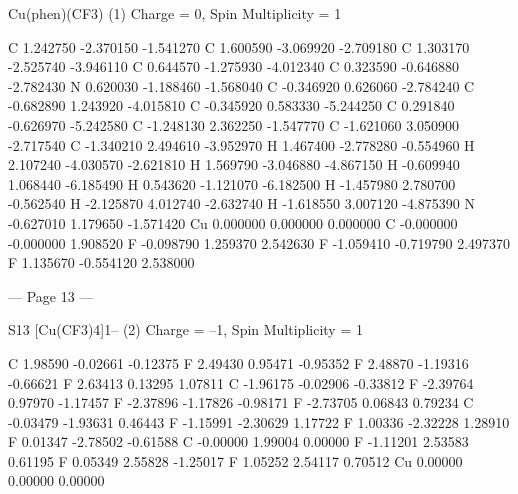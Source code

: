 Cu(phen)(CF3) (1) 
Charge = 0, Spin Multiplicity = 1 
 
  C       1.242750     -2.370150     -1.541270 
  C       1.600590     -3.069920     -2.709180 
  C       1.303170     -2.525740     -3.946110 
  C       0.644570     -1.275930     -4.012340 
  C       0.323590     -0.646880     -2.782430 
  N       0.620030     -1.188460     -1.568040 
  C      -0.346920      0.626060     -2.784240 
  C      -0.682890      1.243920     -4.015810 
  C      -0.345920      0.583330     -5.244250 
  C       0.291840     -0.626970     -5.242580 
  C      -1.248130      2.362250     -1.547770 
  C      -1.621060      3.050900     -2.717540 
  C      -1.340210      2.494610     -3.952970 
  H       1.467400     -2.778280     -0.554960 
  H       2.107240     -4.030570     -2.621810 
  H       1.569790     -3.046880     -4.867150 
  H      -0.609940      1.068440     -6.185490 
  H       0.543620     -1.121070     -6.182500 
  H      -1.457980      2.780700     -0.562540 
  H      -2.125870      4.012740     -2.632740 
  H      -1.618550      3.007120     -4.875390 
  N      -0.627010      1.179650     -1.571420 
  Cu      0.000000      0.000000      0.000000 
  C      -0.000000     -0.000000      1.908520 
  F      -0.098790      1.259370      2.542630 
  F      -1.059410     -0.719790      2.497370 
  F       1.135670     -0.554120      2.538000 
 
 
 
 
 
 
 
 
 
 
 


--- Page 13 ---
 
S13 
[Cu(CF3)4]1– (2) 
Charge = –1, Spin Multiplicity = 1 
 
C          1.98590       -0.02661       -0.12375 
F          2.49430        0.95471       -0.95352 
F          2.48870       -1.19316       -0.66621 
F          2.63413        0.13295        1.07811 
C         -1.96175       -0.02906       -0.33812 
F         -2.39764        0.97970       -1.17457 
F         -2.37896       -1.17826       -0.98171 
F         -2.73705        0.06843        0.79234 
C         -0.03479       -1.93631        0.46443 
F         -1.15991       -2.30629        1.17722 
F          1.00336       -2.32228        1.28910 
F          0.01347       -2.78502       -0.61588 
C         -0.00000        1.99004        0.00000 
F         -1.11201        2.53583        0.61195 
F          0.05349        2.55828       -1.25017 
F          1.05252        2.54117        0.70512 
Cu         0.00000        0.00000        0.00000 
 
